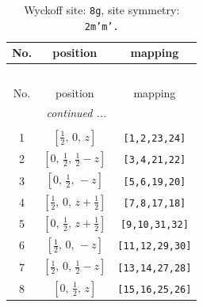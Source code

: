 \documentclass[fleqn,8pt]{jsarticle}
\begin{document}
\begin{longtable}{ccc}
\caption{Wyckoff site: {\tt 8g}, site symmetry: {\tt 2m'm'.}}
 \\
 \hline \hline
No. & position & mapping \\ \hline \endfirsthead

\multicolumn{2}{l}{\tablename\ \thetable{}} \\
 \hline \hline
No. & position & mapping \\ \hline \endhead

 \hline \hline
\multicolumn{2}{r}{\footnotesize\it continued ...} \\ \endfoot

 \hline \hline
\multicolumn{2}{r}{} \\ \endlastfoot

1 & $\left[ \frac{1}{2},\, 0,\, z \right]$ & {\tt [1,2,23,24]} \\ \hline
2 & $\left[ 0,\, \frac{1}{2},\, \frac{1}{2} - z \right]$ & {\tt [3,4,21,22]} \\ \hline
3 & $\left[ 0,\, \frac{1}{2},\, - z \right]$ & {\tt [5,6,19,20]} \\ \hline
4 & $\left[ \frac{1}{2},\, 0,\, z + \frac{1}{2} \right]$ & {\tt [7,8,17,18]} \\ \hline
5 & $\left[ 0,\, \frac{1}{2},\, z + \frac{1}{2} \right]$ & {\tt [9,10,31,32]} \\ \hline
6 & $\left[ \frac{1}{2},\, 0,\, - z \right]$ & {\tt [11,12,29,30]} \\ \hline
7 & $\left[ \frac{1}{2},\, 0,\, \frac{1}{2} - z \right]$ & {\tt [13,14,27,28]} \\ \hline
8 & $\left[ 0,\, \frac{1}{2},\, z \right]$ & {\tt [15,16,25,26]} \\
\end{longtable}
\renewcommand{\arraystretch}{1.2}
\end{document}
